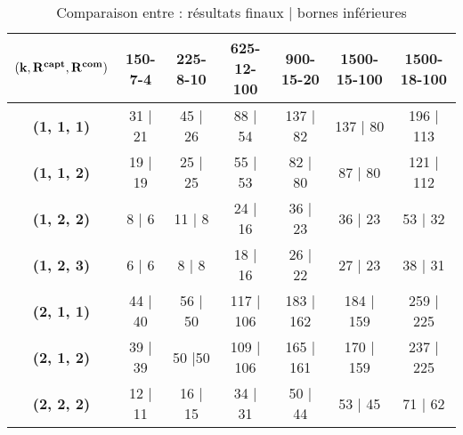 \documentclass[12pt]{article}
\begin{document}
\begin{table}[H]
  \caption{Comparaison entre : résultats finaux | bornes inférieures}
  \centering
  \label{tab:my-table}
  \begin{tabular}{|c|c|c|c|c|c|c|}
  \hline
  $\bf{(k, R^{capt}, R^{com})}$ & \textbf{150-7-4}                                       & \textbf{225-8-10}               & \textbf{625-12-100}               & \textbf{900-15-20}                & \textbf{1500-15-100}              & \textbf{1500-18-100}              \\ \hline
  \textbf{(1, 1, 1)}            & 31 | 21                                                & 45 | 26                         & \cellcolor[HTML]{F8A102}88 | 54   & 137 | 82                          & \cellcolor[HTML]{F8A102}137 | 80  & \cellcolor[HTML]{F56B00}196 | 113 \\ \hline
  \textbf{(1, 1, 2)}            & 19 | 19                                                & 25 | 25                         & 55 | 53                           & \cellcolor[HTML]{F8A102}82 | 80   & \cellcolor[HTML]{F8A102}87 | 80   & 121 | 112                         \\ \hline
  \textbf{(1, 2, 2)}            & 8 | 6                                                  & 11 | 8                          & 24 | 16                           & \cellcolor[HTML]{F8A102}36 | 23   & \cellcolor[HTML]{F8A102}36 | 23   & \cellcolor[HTML]{F56B00}53 | 32   \\ \hline
  \textbf{(1, 2, 3)}            & 6 | 6                                                  & 8 | 8                           & 18 | 16                           & \cellcolor[HTML]{F8A102}26 | 22   & \cellcolor[HTML]{F8A102}27 | 23   & \cellcolor[HTML]{F8A102}38 | 31   \\ \hline
  \textbf{(2, 1, 1)}            & 44 | 40                                                & 56 | 50                         & \cellcolor[HTML]{F56B00}117 | 106 & \cellcolor[HTML]{F56B00}183 | 162 & \cellcolor[HTML]{9A0000}184 | 159 & \cellcolor[HTML]{F56B00}259 | 225 \\ \hline
  \textbf{(2, 1, 2)}            & 39 | 39                                                & 50 |50                          & 109 | 106                         & \cellcolor[HTML]{F8A102}165 | 161 & \cellcolor[HTML]{CB0000}170 | 159 & \cellcolor[HTML]{F56B00}237 | 225 \\ \hline
  \textbf{(2, 2, 2)}            & 12 | 11                                                & 16 | 15                         & 34 | 31                           & \cellcolor[HTML]{F8A102}50 | 44   & 53 | 45                           & \cellcolor[HTML]{F56B00}71 | 62   \\ \hline

\end{tabular}
\end{table}
\end{document}
